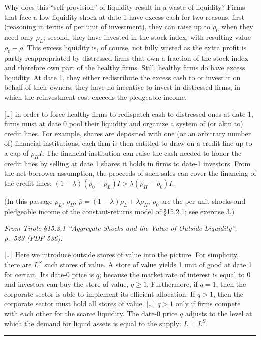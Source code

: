 \documentclass[11pt,a4paper]{article}
\newcommand{\stmtend}{\par\endgroup\nopagebreak\noindent\rule{\linewidth}{0.4pt}\par\medskip}
\begin{document}
Why does this ``self-provision'' of liquidity result in a waste of liquidity? Firms that face a low
liquidity shock at date 1 have excess cash for two reasons: first (reasoning in terms of per unit of
investment), they can raise up to \(\rho_0\) when they need only \(\rho_L\); second, they have
invested in the stock index, with resulting value \(\rho_0 - \bar\rho\). This excess liquidity is,
of course, not fully wasted as the extra profit is partly reappropriated by distressed firms that
own a fraction of the stock index and therefore own part of the healthy firms. Still, healthy firms
do have excess liquidity. At date 1, they either redistribute the excess cash to or invest it on
behalf of their owners; they have no incentive to invest in distressed firms, in which the
reinvestment cost exceeds the pledgeable income.

{[}\ldots{]} in order to force healthy firms to redispatch cash to distressed ones at date 1, firms
must at date 0 pool their liquidity and organize a system of (or akin to) credit lines. For example,
shares are deposited with one (or an arbitrary number of) financial institutions; each firm is then
entitled to draw on a credit line up to a cap of \(\rho_H I\). The financial institution can raise
the cash needed to honor the credit lines by selling at date 1 shares it holds in firms to date-1
investors. From the net-borrower assumption, the proceeds of such sales can cover the financing of
the credit lines: \((1 - \lambda)(\rho_0 - \rho_L)I > \lambda(\rho_H - \rho_0)I\).

(In this passage \(\rho_L\), \(\rho_H\), \(\bar\rho = (1 - \lambda)\rho_L + \lambda\rho_H\),
\(\rho_0\) are the per-unit shocks and pledgeable income of the constant-returns model of §15.2.1;
see exercise 3.)

\emph{From Tirole §15.3.1 ``Aggregate Shocks and the Value of Outside Liquidity'', p.~523 (PDF
536):}

{[}\ldots{]} Here we introduce outside stores of value into the picture. For simplicity, there are
\(L^S\) such stores of value. A store of value yields 1 unit of good at date 1 for certain. Its
date-0 price is \(q\); because the market rate of interest is equal to 0 and investors can buy the
store of value, \(q \geqslant 1\). Furthermore, if \(q = 1\), then the corporate sector is able to
implement its efficient allocation. If \(q > 1\), then the corporate sector must hold all stores of
value. {[}\ldots{]} \(q > 1\) only if firms compete with each other for the scarce liquidity. The
date-0 price \(q\) adjusts to the level at which the demand for liquid assets is equal to the
supply: \(L = L^S\).
\stmtend
\end{document}

